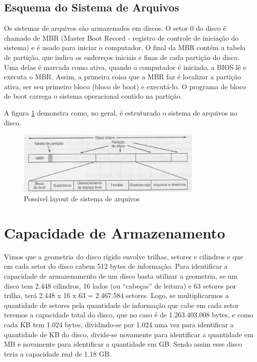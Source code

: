 \section{Esquema do Sistema de Arquivos}

Os sistemas de arquivos são armazenados em discos. O setor 0 do disco é chamado de MBR (Master Boot Record - registro de controle de iniciação do sistema) e é usado para iniciar o computador. O final da MBR contém a tabela de partição, que indica os endereços iniciais e finas de cada partição do disco. Uma delas é marcada como ativa, quando o computador é iniciado, a BIOS lê e executa o MBR. Assim, a primeira coisa que a MBR faz é localizar a partição ativa, ser seu primeiro bloco (bloco de boot) e executá-lo. O programa de bloco de boot carrega o sistema operacional contido na partição.

A figura \ref{fig:esquema_sistemas_arquivos} demonstra como, no geral, é estruturado o sistema de arquivos no disco.

\begin{figure}[htb]
	\centering
	\includegraphics[width=0.8\textwidth]{sistemas_de_arquivos/fig/esquema_sistemas_arquivos.png}
	\caption{Possível layout de sistema de arquivos}
	\label{fig:esquema_sistemas_arquivos}
\end{figure}

\chapter{Capacidade de Armazenamento}

Vimos que a geometria do disco rígido envolve trilhas, setores e cilindros e que em cada setor do disco cabem 512 bytes de informação. Para identificar a capacidade de armazenamento de um disco basta utilizar a geometria, se um disco tem 2.448 cilindros, 16 lados (ou ``cabeças'' de leitura) e 63 setores por trilha, terá 2.448 x 16 x 63 = 2.467.584 setores. Logo, se multiplicarmos a quantidade de setores pela quantidade de informação que cabe em cada setor teremos a capacidade total do disco, que no caso é de 1.263.403.008 bytes, e como cada KB tem 1.024 bytes, dividindo-se por 1.024 uma vez para identificar a quantidade de KB do disco, divide-se novamente para identificar a quantidade em MB e novamente para identificar a quantidade em GB. Sendo assim esse disco teria a capacidade real de 1.18 GB.

